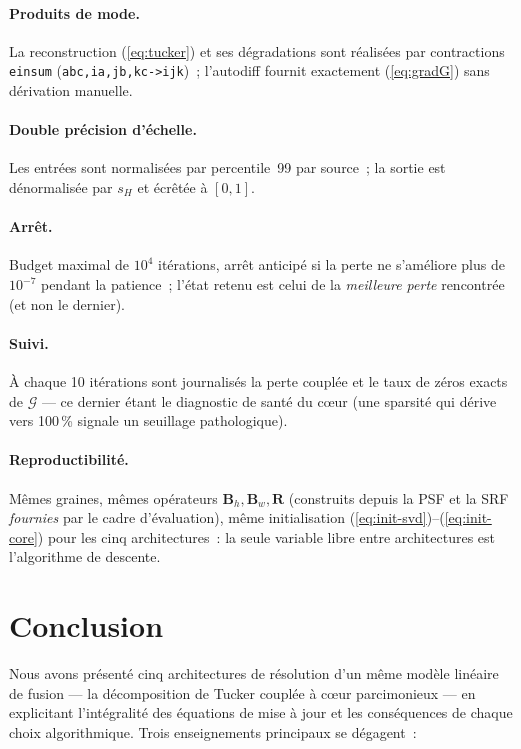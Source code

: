 \documentclass[11pt,a4paper]{article}
\newcommand{\T}[1]{\bm{\mathcal{#1}}}          %
\newcommand{\M}[1]{\bm{#1}}                     %
\begin{document}
\paragraph{Produits de mode.} La reconstruction (\ref{eq:tucker}) et ses
dégradations sont réalisées par contractions \texttt{einsum}
(\texttt{abc,ia,jb,kc->ijk})~; l'autodiff fournit exactement
(\ref{eq:gradG}) sans dérivation manuelle.

\paragraph{Double précision d'échelle.} Les entrées sont normalisées par
percentile~99 par source~; la sortie est dénormalisée par $s_H$ et écrêtée à
$[0,1]$.

\paragraph{Arrêt.} Budget maximal de $10^4$ itérations, arrêt anticipé si la
perte ne s'améliore plus de $10^{-7}$ pendant la patience~; l'état retenu est
celui de la \emph{meilleure perte} rencontrée (et non le dernier).

\paragraph{Suivi.} À chaque 10 itérations sont journalisés la perte couplée
et le taux de zéros exacts de $\T{G}$ — ce dernier étant le diagnostic de
santé du c\oe ur (une sparsité qui dérive vers 100\,\% signale un seuillage
pathologique).

\paragraph{Reproductibilité.} Mêmes graines, mêmes opérateurs
$\M{B}_h,\M{B}_w,\M{R}$ (construits depuis la PSF et la SRF \emph{fournies}
par le cadre d'évaluation), même initialisation
(\ref{eq:init-svd})--(\ref{eq:init-core}) pour les cinq architectures~: la
seule variable libre entre architectures est l'algorithme de descente.

\section{Conclusion}

Nous avons présenté cinq architectures de résolution d'un même modèle
linéaire de fusion — la décomposition de Tucker couplée à c\oe ur
parcimonieux — en explicitant l'intégralité des équations de mise à jour et
les conséquences de chaque choix algorithmique. Trois enseignements
principaux se dégagent~:
\end{document}
